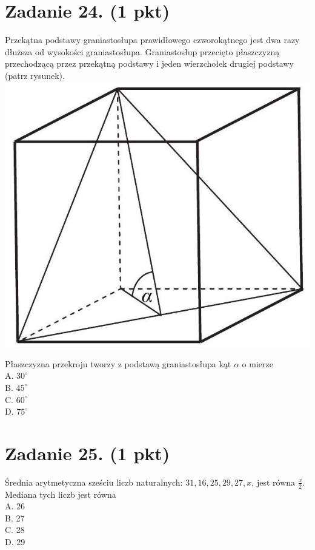 \documentclass[10pt]{article}
\begin{document}
\section*{Zadanie 24. (1 pkt)}
Przekątna podstawy graniastosłupa prawidłowego czworokątnego jest dwa razy dłuższa od wysokości graniastosłupa. Graniastosłup przecięto płaszczyzną przechodzącą przez przekątną podstawy i jeden wierzchołek drugiej podstawy (patrz rysunek).\\
\includegraphics[max width=\textwidth, center]{2024_11_21_779b7f825da3a12753feg-10}

Płaszczyzna przekroju tworzy z podstawą graniastosłupa kąt \(\alpha\) o mierze\\
A. \(30^{\circ}\)\\
B. \(45^{\circ}\)\\
C. \(60^{\circ}\)\\
D. \(75^{\circ}\)

\section*{Zadanie 25. (1 pkt)}
Średnia arytmetyczna sześciu liczb naturalnych: \(31,16,25,29,27, x\), jest równa \(\frac{x}{2}\). Mediana tych liczb jest równa\\
A. 26\\
B. 27\\
C. 28\\
D. 29
\end{document}
